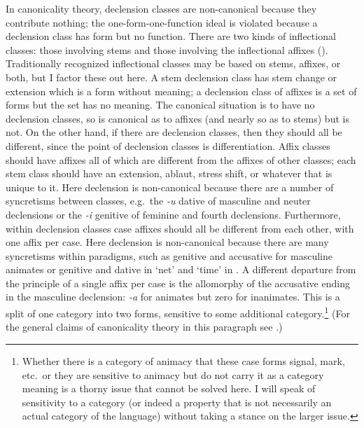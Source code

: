 \documentclass[output=collectionpaper]{langsci/langscibook}
\begin{document}
In canonicality theory, declension classes are non-canonical because they contribute nothing; the one-form-one-function ideal is violated because a declension class has form but no function. There are two kinds of inflectional classes: those involving stems and those involving the inflectional affixes (\citealt[184]{Bickel2007}). Traditionally recognized inflectional classes may be based on stems, affixes, or both, but I factor these out here.  A stem declension class has stem change or extension which is a form without meaning; a declension class of affixes is a set of forms but the set has no meaning. The canonical situation is to have no declension classes, so  is canonical as to affixes (and nearly so as to stems) but  is not. On the other hand, if there are declension classes, then they should all be different, since the point of declension classes is differentiation. Affix classes should have affixes all of which are different from the affixes of other classes; each stem class should have an extension, ablaut, stress shift, or whatever that is unique to it. Here  declension is non-canonical because there are a number of syncretisms between classes, e.g.\ the \textit{-u} dative of masculine and neuter declensions or the \textit{-i} genitive of feminine and fourth declensions. Furthermore, within declension classes case affixes should all be different from each other, with one affix per case. Here  declension is non-canonical because there are many syncretisms within paradigms, such as genitive and accusative for masculine animates or genitive and dative in `net' and `time' in . A different departure from the principle of a single affix per case is the allomorphy of the accusative ending in the masculine declension: \textit{-a} for animates but zero for inanimates. This is a split of one category into two forms, sensitive to some additional category.\footnote{%
Whether there is a category of animacy that these case forms signal, mark, etc.\ or they are sensitive to animacy but do not carry it as a category meaning is a thorny issue that cannot be solved here. I will speak of sensitivity to a category (or indeed a property that is not necessarily an actual category of the language) without taking a stance on the larger issue.
} %
(For the general claims of canonicality theory in this paragraph see \citealt{Corbett2007,Corbett2013c,Corbett2015}.)
\end{document}

